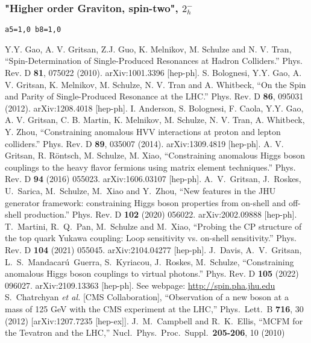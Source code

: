 \documentclass[aps,superscriptaddress,nofootinbib]{revtex4}
\begin{document}
\subsubsection{"Higher order Graviton, spin-two", \texorpdfstring{$2^-_h$}{2-h}}
\verb|a5=1,0 b8=1,0|
\begin{thebibliography}{99}
Y.Y. Gao, A. V. Gritsan, Z.J. Guo, K. Melnikov, M. Schulze and N. V. Tran, ``Spin-Determination of Single-Produced Resonances at Hadron Colliders.'' Phys. Rev. D \textbf{81}, 075022 (2010). arXiv:1001.3396 [hep-ph].
S. Bolognesi, Y.Y. Gao, A. V. Gritsan, K. Melnikov, M. Schulze, N. V. Tran and A. Whitbeck, ``On the Spin and Parity of Single-Produced Resonance at the LHC.'' Phys. Rev. D \textbf{86}, 095031 (2012). arXiv:1208.4018 [hep-ph].
I. Anderson, S. Bolognesi, F. Caola, Y.Y. Gao, A. V. Gritsan, C. B. Martin, K. Melnikov, M. Schulze, N. V. Tran, A. Whitbeck, Y. Zhou, ``Constraining anomalous HVV interactions at proton and lepton colliders.'' Phys. Rev. D \textbf{89}, 035007 (2014). arXiv:1309.4819 [hep-ph].
A. V. Gritsan, R. R\"ontsch, M. Schulze, M. Xiao, ``Constraining anomalous Higgs boson couplings to the heavy flavor fermions using matrix element techniques.'' Phys. Rev. D \textbf{94} (2016) 055023. arXiv:1606.03107 [hep-ph].
 A.~V.~Gritsan, J.~Roskes, U.~Sarica, M.~Schulze, M.~Xiao and Y.~Zhou, ``New features in the JHU generator framework: 
 constraining Higgs boson properties from on-shell and off-shell production.'' 
 Phys. Rev. D \textbf{102} (2020) 056022. arXiv:2002.09888 [hep-ph].
T.~Martini, R.~Q.~Pan, M.~Schulze and M.~Xiao,
``Probing the CP structure of the top quark Yukawa coupling: Loop sensitivity vs. on-shell sensitivity.''
Phys. Rev. D \textbf{104} (2021) 055045. arXiv:2104.04277 [hep-ph].
J.~Davis, A.~V.~Gritsan, L.~S.~Mandacar\'{u}~Guerra, S.~Kyriacou, J.~Roskes, M.~Schulze, ``Constraining anomalous Higgs boson couplings to virtual photons.'' 
 Phys. Rev. D \textbf{105} (2022) 096027. arXiv:2109.13363 [hep-ph].
See webpage: \url{http://spin.pha.jhu.edu}
  S.~Chatrchyan {\it et al.}  [CMS Collaboration],
  ``Observation of a new boson at a mass of 125 GeV with the CMS experiment at the LHC,''
  Phys.\ Lett.\ B {\bf 716}, 30 (2012)
  [arXiv:1207.7235 [hep-ex]].
  J.~M.~Campbell and R.~K.~Ellis,
  ``MCFM for the Tevatron and the LHC,''
  Nucl.\ Phys.\ Proc.\ Suppl.\  {\bf 205-206}, 10 (2010)

\end{thebibliography}
\end{document}
